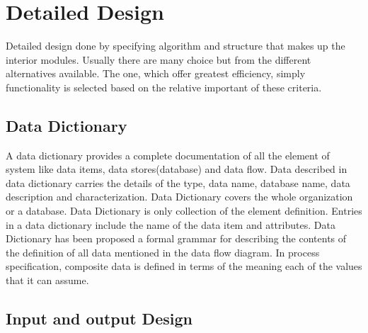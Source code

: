 \chapter{Detailed Design}

Detailed design done by specifying algorithm and structure that makes up the interior modules. Usually there are many choice but from the different alternatives available. The one, which offer greatest efficiency, simply functionality is selected based on the relative important of these criteria.

\section{Data Dictionary}
A data dictionary provides a complete documentation of all the element of system like data items, data stores(database) and data flow. Data described in data dictionary carries the details of the type, data name, database name, data description and characterization. Data Dictionary covers the whole organization or a database. Data Dictionary is only collection of the element definition. Entries in a data dictionary include the name of the data item and attributes. Data Dictionary has been proposed a formal grammar for describing the contents of the definition of all data mentioned in the data flow diagram. In process specification, composite data is defined in terms of the meaning each of the values that it can assume.

\section{Input and output Design}

